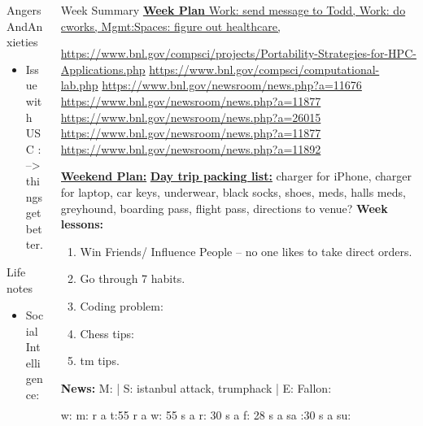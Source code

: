 \documentclass[serif, mathserif, final]{beamer}
\begin{document}
\begin{frame}
\begin{columns}
\begin{column}{0.25\linewidth}
\begin{block}{AngersAndAnxieties}
\begin{itemize}
        \item \tiny Issue with USC : --> things get better. 

        \end{itemize}
      \end{block}
      \begin{block}{Life notes}
        \begin{itemize}
          \tiny \item \tiny Social Intelligence: 
        \end{itemize}
      \end{block}
    \end{column}

\begin{column}{0.5\linewidth} 
  \begin{block}{Week Summary} 
    {\tiny \underline{\textbf{Week Plan}
      Work: send message to Todd, 
      Work: do cworks,
      Mgmt:Spaces: figure out healthcare,}
    }

\url{https://www.bnl.gov/compsci/projects/Portability-Strategies-for-HPC-Applications.php} 
\url{https://www.bnl.gov/compsci/computational-lab.php}
\url{https://www.bnl.gov/newsroom/news.php?a=11676} 
\url{https://www.bnl.gov/newsroom/news.php?a=11877}
\url{https://www.bnl.gov/newsroom/news.php?a=26015} 
\url{ https://www.bnl.gov/newsroom/news.php?a=11877} 
\url{https://www.bnl.gov/newsroom/news.php?a=11892}


    {\tiny \underline{\textbf{Weekend Plan:}}}
    {\underline{\bf Day trip packing list:} charger for iPhone,
      charger for laptop, car keys, underwear, black socks, shoes, meds, halls
      meds, greyhound, boarding pass, flight pass, directions to
      venue?}
    {\tiny {\bf Week lessons:}}
    \begin{enumerate}
      \tiny \item \tiny Win Friends/ Influence People – no one
      likes to take direct orders.
    \item \tiny Go through 7 habits.
    \item \tiny Coding problem: 
    \item \tiny Chess tips: 
    \item \tiny tm tips.
    \end{enumerate}
        {{\tiny \bf News:} M: | S: istanbul attack, trumphack
          | E: Fallon:

          w: {m: { r a}}  t:{55 r a} {w: {55 s a}} {r: {30 s a}} {f: {28 s a   }} 
          {sa :{30 s a} }
          {su: {  }  } } 
        

\end{block}
\end{column}
\end{columns}
\end{frame}
\end{document}
